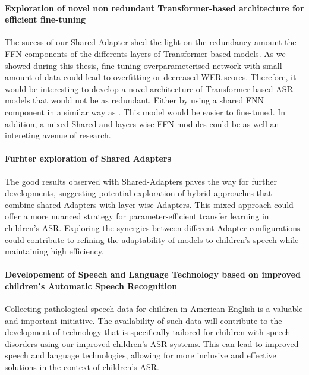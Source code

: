 \paragraph*{Exploration of novel non redundant Transformer-based architecture for efficient fine-tuning} The sucess of our Shared-Adapter shed the light on the redundancy amount the FFN components of the differents layers of Transformer-based models. As we showed during this thesis, fine-tuning  overparameterised network with small amount of data could lead to overfitting or decreased WER scores. Therefore, it would be interesting to develop a novel architecture of Transformer-based ASR models that would not be as redundant. Either by using a shared FNN component in a similar way as \cite{pires2023one}. This model would be easier to fine-tuned. In addition, a mixed Shared and layers wise FFN modules could be as well an intereting avenue of research.

\paragraph*{Furhter exploration of Shared Adapters} The good results observed with Shared-Adapters paves the way for further developments, suggesting potential exploration of hybrid approaches that combine shared Adapters with layer-wise Adapters. This mixed approach could offer a more nuanced strategy for parameter-efficient transfer learning in children's ASR. Exploring the synergies between different Adapter configurations could contribute to refining the adaptability of models to children's speech while maintaining high efficiency.

\paragraph*{Developement of Speech and Language Technology based on improved children's Automatic Speech Recognition} Collecting pathological speech data for children in American English is a valuable and important initiative. The availability of such data will contribute to the development of technology that is specifically tailored for children with speech disorders using our improved children's ASR systems. This can lead to improved speech and language technologies, allowing for more inclusive and effective solutions in the context of children's ASR. 